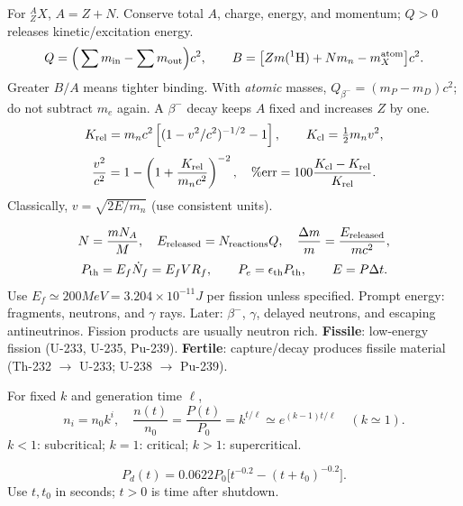 \begin{handoutcolumns}
For ${}^{A}_{Z}X$, $A=Z+N$. Conserve total $A$, charge, energy,
and momentum; $Q>0$ releases kinetic/excitation energy.
\[
 Q=\Big(\sum m_{\rm in}-\sum m_{\rm out}\Big)c^2,
 \qquad B=\big[Z m({}^{1}{\rm H})+Nm_n-m_{
 X}^{\rm atom}\big]c^2.
\]
Greater $B/A$ means tighter binding. With \emph{atomic} masses,
$Q_{\beta^-}=(m_P-m_D)c^2$; do not subtract $m_e$ again.
A $\beta^-$ decay keeps $A$ fixed and increases $Z$ by one.
\[
 K_{\rm rel}=m_nc^2\left[(1-v^2/c^2)^{-1/2}-1\right],
 \qquad K_{\rm cl}=\tfrac12m_nv^2,
\]
\[
 \frac{v^2}{c^2}=1-\left(1+\frac{K_{\rm rel}}{m_nc^2}\right)^{-2},
 \quad \%\mathrm{err}=100\frac{K_{\rm cl}-K_{\rm rel}}{K_{\rm rel}}.
\]
Classically, $v=\sqrt{2E/m_n}$ (use consistent units).


\[
 N=\frac{mN_A}{M},\quad E_{\rm released}=N_{\rm reactions}Q,
 \quad \frac{\Delta m}{m}=\frac{E_{\rm released}}{mc^2},
\]
\[
 P_{\rm th}=E_f\dot N_f=E_fVR_f,
 \qquad P_e=\epsilon_{\rm th}P_{\rm th},\qquad E=P\Delta t.
\]
Use $E_f\simeq200\unit{MeV}=3.204\times10^{-11}\unit{J}$ per
fission unless specified. Prompt energy: fragments, neutrons, and
$\gamma$ rays. Later: $\beta^-$, $\gamma$, delayed neutrons, and
escaping antineutrinos. Fission products are usually neutron rich.
\textbf{Fissile}: low-energy fission (U-233, U-235, Pu-239).
\textbf{Fertile}: capture/decay produces fissile material
(Th-232 $\to$ U-233; U-238 $\to$ Pu-239).

For fixed $k$ and generation time $\ell$,
\[
 n_i=n_0k^i,\quad
 \frac{n(t)}{n_0}=\frac{P(t)}{P_0}=k^{t/\ell}
 \simeq e^{(k-1)t/\ell}\quad(k\simeq1).
\]
$k<1$: subcritical; $k=1$: critical; $k>1$: supercritical.

\vspace{0.25cm}
\[
 P_d(t)=0.0622P_0\big[t^{-0.2}-(t+t_0)^{-0.2}\big].
\]
Use $t,t_0$ in seconds; $t>0$ is time after shutdown.


\end{handoutcolumns}
